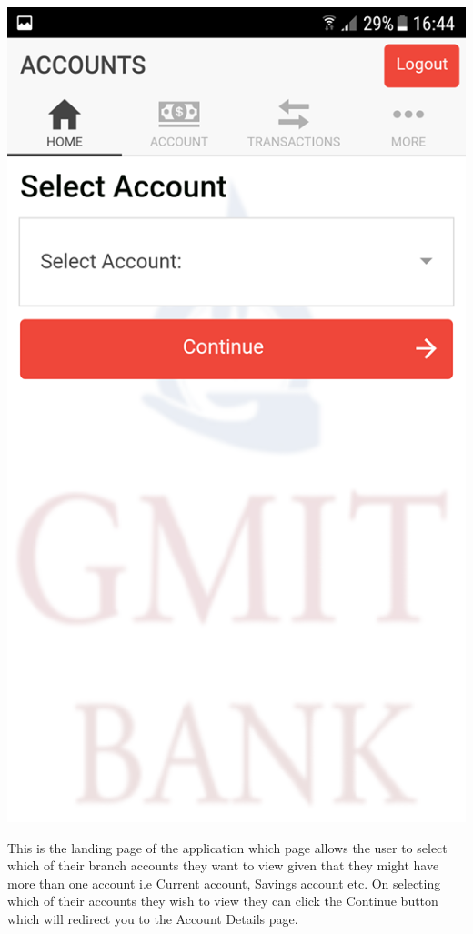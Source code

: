\begin{center}    
    \includegraphics[scale=0.5]{img/5homepageempty.png}
\end{center}
 This is the landing page of the application which page allows the user to select which of their branch accounts they want to view given that they might have more than one account i.e Current account, Savings account etc. On selecting which of their accounts they wish to view they can click the Continue button which will redirect you to the Account Details page.\paragraph{}
 

